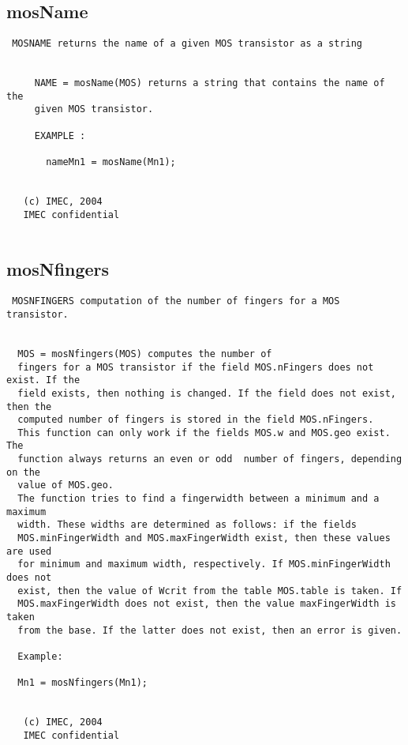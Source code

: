 \newpage
\subsection{mosName}
\label{sec:mosName}
\begin{verbatim}
 MOSNAME returns the name of a given MOS transistor as a string
 
 
     NAME = mosName(MOS) returns a string that contains the name of the
     given MOS transistor.
 
     EXAMPLE :
   
       nameMn1 = mosName(Mn1);
 
 
   (c) IMEC, 2004
   IMEC confidential 
 

\end{verbatim}

\newpage
\subsection{mosNfingers}
\label{sec:mosNfingers}
\begin{verbatim}
 MOSNFINGERS computation of the number of fingers for a MOS transistor.
 
 
  MOS = mosNfingers(MOS) computes the number of
  fingers for a MOS transistor if the field MOS.nFingers does not exist. If the
  field exists, then nothing is changed. If the field does not exist, then the
  computed number of fingers is stored in the field MOS.nFingers. 
  This function can only work if the fields MOS.w and MOS.geo exist. The
  function always returns an even or odd  number of fingers, depending on the
  value of MOS.geo. 
  The function tries to find a fingerwidth between a minimum and a maximum
  width. These widths are determined as follows: if the fields
  MOS.minFingerWidth and MOS.maxFingerWidth exist, then these values are used
  for minimum and maximum width, respectively. If MOS.minFingerWidth does not
  exist, then the value of Wcrit from the table MOS.table is taken. If
  MOS.maxFingerWidth does not exist, then the value maxFingerWidth is taken
  from the base. If the latter does not exist, then an error is given. 
 
  Example:
 
  Mn1 = mosNfingers(Mn1);
 
 
   (c) IMEC, 2004
   IMEC confidential 
 

\end{verbatim}

\newpage
